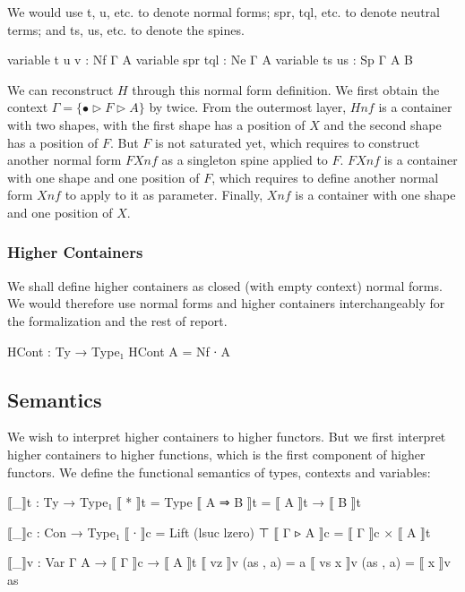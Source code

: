 We would use t, u, etc. to denote normal forms; spr, tql, etc. to denote neutral terms; and ts, us, etc. to denote the spines.

\begin{code}[hide]
variable t u v : Nf Γ A
variable spr tql : Ne Γ A
variable ts us : Sp Γ A B
\end{code}

We can reconstruct $H$ through this normal form definition. We first obtain the context $\Gamma = \{ \bullet \triangleright F \triangleright A\}$ by  twice. From the outermost layer, $Hnf$ is a container with two shapes, with the first shape has a position of $X$ and the second shape has a position of $F$. But $F$ is not saturated yet, which requires to construct another normal form $FXnf$ as a singleton spine applied to $F$. $FXnf$ is a container with one shape and one position of $F$, which requires to define another normal form $Xnf$ to apply to it as parameter. Finally, $Xnf$ is a container with one shape and one position of $X$. \hyperref[Hnf]{\faCog}

\subsubsection{Higher Containers}

We shall define higher containers as closed (with empty context) normal forms. We would therefore use normal forms and higher containers interchangeably for the formalization and the rest of report.

\begin{code}
HCont : Ty → Type₁
HCont A = Nf ∙ A
\end{code}

\subsection{Semantics}

We wish to interpret higher containers to higher functors. But we first interpret higher containers to higher functions, which is the first component of higher functors. We define the functional semantics of types, contexts and variables:

\begin{code}
⟦_⟧t : Ty → Type₁
⟦ * ⟧t = Type
⟦ A ⇒ B ⟧t = ⟦ A ⟧t → ⟦ B ⟧t

⟦_⟧c : Con → Type₁
⟦ ∙ ⟧c = Lift (lsuc lzero) ⊤
⟦ Γ ▹ A ⟧c = ⟦ Γ ⟧c × ⟦ A ⟧t

⟦_⟧v : Var Γ A → ⟦ Γ ⟧c → ⟦ A ⟧t
⟦ vz ⟧v (as , a) = a
⟦ vs x ⟧v (as , a) = ⟦ x ⟧v as
\end{code}

